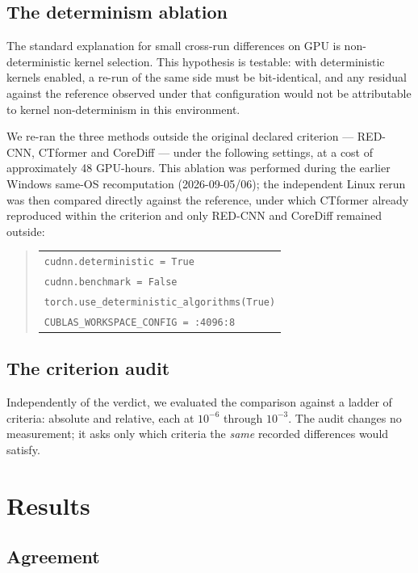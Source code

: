 \documentclass[11pt]{article}
\begin{document}
\subsection{The determinism ablation}
\label{sec:determinism}

The standard explanation for small cross-run differences on GPU is non-deterministic kernel
selection. This hypothesis is testable: with deterministic kernels
enabled, a re-run of the same side must be bit-identical, and any residual against the reference
observed under that configuration would not be attributable to kernel non-determinism in this
environment.

We re-ran the three methods outside the original declared criterion --- RED-CNN, CTformer and
CoreDiff --- under the following settings, at a cost of approximately 48 GPU-hours. This ablation
was performed during the earlier Windows same-OS recomputation (2026-09-05/06); the independent
Linux rerun was then compared directly against the reference, under which CTformer already
reproduced within the criterion and only RED-CNN and CoreDiff remained outside:

\begin{quote}
\begin{tabular}{@{}l@{}}
\texttt{cudnn.deterministic = True} \\
\texttt{cudnn.benchmark = False} \\
\texttt{torch.use\_deterministic\_algorithms(True)} \\
\texttt{CUBLAS\_WORKSPACE\_CONFIG = :4096:8} \\
\end{tabular}
\end{quote}

\subsection{The criterion audit}
\label{sec:ladder}

Independently of the verdict, we evaluated the comparison against a ladder of criteria: absolute and
relative, each at $10^{-6}$ through $10^{-3}$. The audit changes no measurement; it asks only which
criteria the \emph{same} recorded differences would satisfy.

\section{Results}

\subsection{Agreement}
\end{document}
